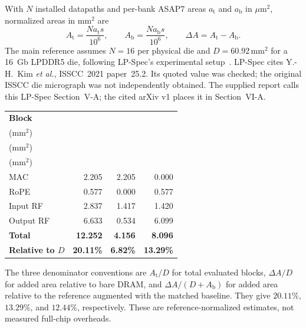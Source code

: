 With $N$ installed datapaths and per-bank ASAP7 areas $a_{\mathrm{t}}$ and $a_{\mathrm{b}}$ in $\mu\mathrm{m}^{2}$, normalized areas in $\mathrm{mm}^{2}$ are
\[
A_{\mathrm{t}}=\frac{Na_{\mathrm{t}}s}{10^{6}},\qquad
A_{\mathrm{b}}=\frac{Na_{\mathrm{b}}s}{10^{6}},\qquad
\Delta A=A_{\mathrm{t}}-A_{\mathrm{b}}.
\]
The main reference assumes $N=16$ per physical die and $D=60.92\,\mathrm{mm}^{2}$ for a 16~Gb LPDDR5 die, following LP-Spec's experimental setup~\cite{lp_spec}. LP-Spec cites Y.-H.~Kim \emph{et al.}, ISSCC~2021 paper~25.2. Its quoted value was checked; the original ISSCC die micrograph was not independently obtained. The supplied report calls this LP-Spec Section~V-A; the cited arXiv v1 places it in Section~VI-A.
\par\smallskip
{\centering\footnotesize\setlength{\tabcolsep}{5pt}
\begin{tabular}{@{}lrrr@{}}
\toprule
\textbf{Block} & \shortstack{\textbf{Target}\\($\mathrm{mm}^{2}$)} & \shortstack{\textbf{Baseline}\\($\mathrm{mm}^{2}$)} & \shortstack{\textbf{Added}\\($\mathrm{mm}^{2}$)} \\
\midrule
MAC & 2.205 & 2.205 & 0.000 \\
RoPE & 0.577 & 0.000 & 0.577 \\
Input RF & 2.837 & 1.417 & 1.420 \\
Output RF & 6.633 & 0.534 & 6.099 \\
\midrule
\textbf{Total} & \textbf{12.252} & \textbf{4.156} & \textbf{8.096} \\
\textbf{Relative to $D$} & \textbf{20.11\%} & \textbf{6.82\%} & \textbf{13.29\%} \\
\bottomrule
\end{tabular}\par}\smallskip
The three denominator conventions are $A_{\mathrm{t}}/D$ for total evaluated blocks, $\Delta A/D$ for added area relative to bare DRAM, and $\Delta A/(D+A_{\mathrm{b}})$ for added area relative to the reference augmented with the matched baseline. They give $20.11\%$, $13.29\%$, and $12.44\%$, respectively. These are reference-normalized estimates, not measured full-chip overheads.

